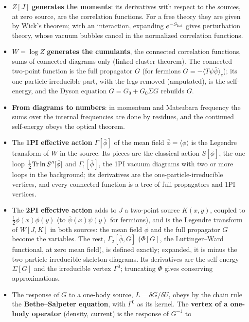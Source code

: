 \documentclass[11pt,a4paper]{article}
\begin{document}
\begin{itemize}[leftmargin=1.2em, itemsep=0pt]
\item $Z[J]$ \textbf{generates the moments}: its derivatives with respect to the sources, at zero source, are the
  correlation functions. For a free theory they are given by Wick's theorem; with an interaction, expanding $e^{-S_{\rm int}}$ gives
  perturbation theory, whose vacuum bubbles cancel in the normalized correlation functions.
\item $W=\log Z$ \textbf{generates the cumulants}, the connected correlation functions, sums of connected diagrams only
  (linked-cluster theorem). The connected two-point function is the full propagator $G$ (for fermions
  $G=-\langle T\psi\bar\psi\rangle_c$); its one-particle-irreducible part, with the legs removed
  (amputated), is the self-energy, and the Dyson equation $G=G_0+G_0\Sigma G$ rebuilds $G$.
\item \textbf{From diagrams to numbers}: in momentum and Matsubara frequency the sums over the internal frequencies
  are done by residues, and the continued self-energy obeys the optical theorem.
\item The \textbf{1PI effective action} $\Gamma[\bar\phi]$ of the mean field $\bar\phi=\langle\phi\rangle$ is the Legendre transform of $W$ in the source. Its pieces are the classical action $S[\bar\phi]$, the
  one loop $\frac12{\rm Tr}\ln S''[\bar\phi]$ and $\Gamma_1[\bar\phi]$, the 1PI vacuum diagrams with two or more loops in the background; its derivatives are
  the one-particle-irreducible vertices, and every connected function is a tree of full propagators and 1PI vertices.
\item The \textbf{2PI effective action} adds to $J$ a two-point source $K(x,y)$, coupled to $\frac12\phi(x)\phi(y)$ (to
  $\bar\psi(x)\psi(y)$ for fermions), and is the Legendre transform of $W[J,K]$ in both sources: the mean field $\bar\phi$ and
  the full propagator $G$ become the variables. The rest, $\Gamma_2[\bar\phi,G]$ ($\Phi[G]$, the Luttinger--Ward functional, at
  zero mean field), is defined exactly; expanded, it is minus the two-particle-irreducible skeleton diagrams. Its derivatives
  are the self-energy $\Sigma[G]$ and the irreducible vertex $\Gamma^0$; truncating $\Phi$ gives conserving approximations.
\item The response of $G$ to a one-body source, $L=\delta G/\delta U$, obeys by the chain rule the \textbf{Bethe--Salpeter equation}, with $\Gamma^0$ as its kernel. The \textbf{vertex of a one-body operator} (density, current) is the response of $G^{-1}$ to

\end{itemize}
\end{document}

